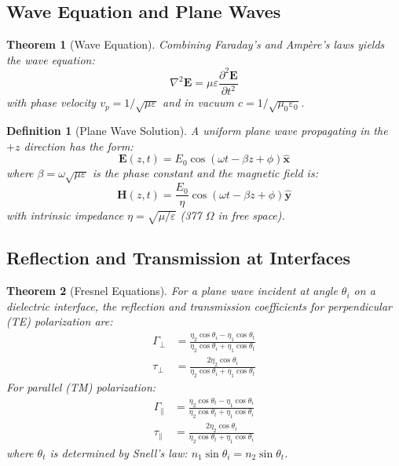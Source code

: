 \documentclass[a4paper, 11pt]{article}
\newtheorem{definition}{Definition}[section]
\newtheorem{theorem}{Theorem}[section]
\begin{document}
\subsection{Wave Equation and Plane Waves}

\begin{theorem}[Wave Equation]
Combining Faraday's and Ampère's laws yields the wave equation:
\begin{equation}
\nabla^2 \mathbf{E} = \mu \varepsilon \frac{\partial^2 \mathbf{E}}{\partial t^2}
\end{equation}
with phase velocity $v_p = 1/\sqrt{\mu \varepsilon}$ and in vacuum $c = 1/\sqrt{\mu_0 \varepsilon_0}$.
\end{theorem}

\begin{definition}[Plane Wave Solution]
A uniform plane wave propagating in the $+z$ direction has the form:
\begin{equation}
\mathbf{E}(z,t) = E_0 \cos(\omega t - \beta z + \phi) \hat{\mathbf{x}}
\end{equation}
where $\beta = \omega\sqrt{\mu\varepsilon}$ is the phase constant and the magnetic field is:
\begin{equation}
\mathbf{H}(z,t) = \frac{E_0}{\eta} \cos(\omega t - \beta z + \phi) \hat{\mathbf{y}}
\end{equation}
with intrinsic impedance $\eta = \sqrt{\mu/\varepsilon}$ (377 $\Omega$ in free space).
\end{definition}

\subsection{Reflection and Transmission at Interfaces}

\begin{theorem}[Fresnel Equations]
For a plane wave incident at angle $\theta_i$ on a dielectric interface, the reflection
and transmission coefficients for perpendicular (TE) polarization are:
\begin{align}
\Gamma_\perp &= \frac{\eta_2 \cos\theta_i - \eta_1 \cos\theta_t}{\eta_2 \cos\theta_i + \eta_1 \cos\theta_t}\\
\tau_\perp &= \frac{2\eta_2 \cos\theta_i}{\eta_2 \cos\theta_i + \eta_1 \cos\theta_t}
\end{align}
For parallel (TM) polarization:
\begin{align}
\Gamma_\parallel &= \frac{\eta_2 \cos\theta_t - \eta_1 \cos\theta_i}{\eta_2 \cos\theta_t + \eta_1 \cos\theta_i}\\
\tau_\parallel &= \frac{2\eta_2 \cos\theta_i}{\eta_2 \cos\theta_t + \eta_1 \cos\theta_i}
\end{align}
where $\theta_t$ is determined by Snell's law: $n_1 \sin\theta_i = n_2 \sin\theta_t$.
\end{theorem}
\end{document}
